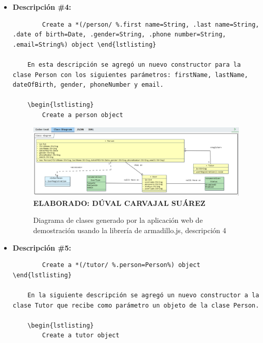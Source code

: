 \begin{itemize}
	\item \textbf{Descripción \#4:}
	
	\begin{lstlisting}
		Create a *(/person/ %.first name=String, .last name=String, .date of birth=Date, .gender=String, .phone number=String, .email=String%) object \end{lstlisting}
	
	En esta descripción se agregó un nuevo constructor para la clase Person con los siguientes parámetros: firstName, lastName, dateOfBirth, gender, phoneNumber y email.
	
	\begin{lstlisting}
		Create a person object  \end{lstlisting}
	
	\begin{figure}[h!]
		\caption{Diagrama de clases generado por la aplicación web de demostración usando la librería de armadillo.js, descripción 4}
		\includegraphics[width=15cm]{img/prueba04.png}
		\label{fig:prueba04}
		\textbf{\\ ELABORADO: DÚVAL CARVAJAL SUÁREZ}
	\end{figure}

	\item \textbf{Descripción \#5:}
	\begin{lstlisting}
		Create a *(/tutor/ %.person=Person%) object \end{lstlisting}

	En la siguiente descripción se agregó un nuevo constructor a la clase Tutor que recibe como parámetro un objeto de la clase Person. 
	
	\begin{lstlisting}
		Create a tutor object  \end{lstlisting}
	

\end{itemize}
